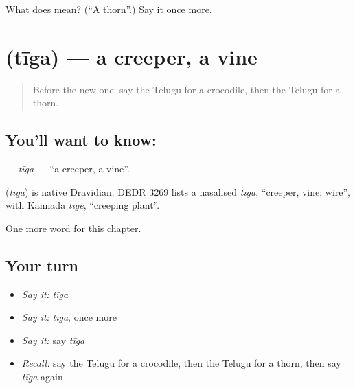 \begin{tcolorbox}[breakable,colback=teal!4,colframe=teal!35!black,title={Before you move on}]
What does  mean? (\textquotedblleft{}A thorn\textquotedblright{}.) Say it once more.
\end{tcolorbox}
\section[\texorpdfstring{\te{తీగ} (tīga)}{తీగ (tīga)}]{ (tīga) — a creeper, a vine}

\label{lesson:TE-C303-tiga}



\begin{quote}
Before the new one: say the Telugu for a crocodile, then the Telugu for a thorn.
\end{quote}

\subsection*{You'll want to know: }
\textbf{} — \emph{tīga} — \textquotedblleft{}a creeper, a vine\textquotedblright{}.

\begin{cousinweb}
\textbf{} (\emph{tīga}) is native Dravidian. DEDR 3269 lists a nasalised \emph{tīga}, \textquotedblleft{}creeper, vine; wire\textquotedblright{}, with Kannada \emph{tīge}, \textquotedblleft{}creeping plant\textquotedblright{}.
\end{cousinweb}

\begin{grammarlens}[title={What you've built}]
One more word for this chapter.
\end{grammarlens}

\subsection*{Your turn}
\begin{itemize}
\raggedright
  \item \emph{Say it:} \emph{tīga}
  \item \emph{Say it:} \emph{tīga}, once more
  \item \emph{Say it:} say \emph{tīga}
  \item \emph{Recall:} say the Telugu for a crocodile, then the Telugu for a thorn, then say \emph{tīga} again
\end{itemize}

